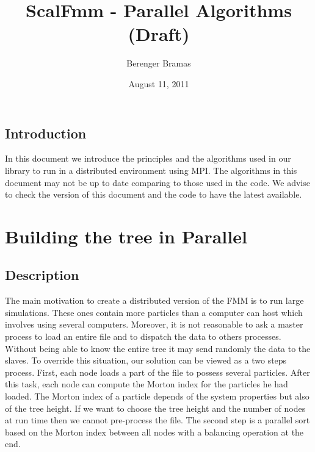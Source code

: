 \documentclass[12pt,letterpaper,titlepage]{report}
\author{Berenger Bramas}
\title{ScalFmm - Parallel Algorithms (Draft)}
\date{August 11, 2011}
\begin{document}
\maketitle{}
\newpage
\tableofcontents
\newpage
\section{Introduction}
In this document we introduce the principles and the algorithms used
in our library to run in a distributed environment using MPI.  The
algorithms in this document may not be up to date comparing to those
used in the code.  We advise to check the version of this document and
the code to have the latest available.
\chapter{Building the tree in Parallel}
\section{Description}
The main motivation to create a distributed version of the FMM is to
run large simulations.  These ones contain more particles than a
computer can host which involves using several computers.  Moreover,
it is not reasonable to ask a master process to load an entire file
and to dispatch the data to others processes. Without being able to
know the entire tree it may send randomly the data to the slaves.  To
override this situation, our solution can be viewed as a two steps
process.  First, each node loads a part of the file to possess several
particles.  After this task, each node can compute the Morton index
for the particles he had loaded.  The Morton index of a particle
depends of the system properties but also of the tree height.  If we
want to choose the tree height and the number of nodes at run time
then we cannot pre-process the file.  The second step is a parallel
sort based on the Morton index between all nodes with a balancing
operation at the end.
\end{document}
